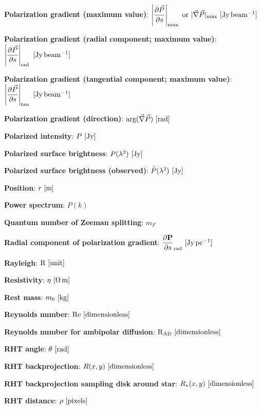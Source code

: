 \documentclass[a4paper,10pt]{article}
\begin{document}
{\noindent}\textbf{Polarization gradient (maximum value)}: $\left\lvert\dfrac{\partial\vec{P}}{\partial s}\right\rvert_{\rm max}~{\rm or}~\lvert\vec\nabla\vec{P}\rvert_{\rm max} ~ [\rm Jy\,beam^{-1}]$

{\noindent}\textbf{Polarization gradient (radial component; maximum value)}: $\left\lvert\dfrac{\partial\vec{P}}{\partial s}\right\rvert_\mathrm{rad}~ [\rm Jy\,beam^{-1}]$

{\noindent}\textbf{Polarization gradient (tangential component; maximum value)}: $\left\lvert\dfrac{\partial\vec{P}}{\partial s}\right\rvert_\mathrm{tan}~ [\rm Jy\,beam^{-1}]$

{\noindent}\textbf{Polarization gradient (direction)}: $\mathrm{arg}(\vec\nabla\vec{P}) ~ [\rm rad]$

{\noindent}\textbf{Polarized intensity}: $P ~ [\rm Jy]$

{\noindent}\textbf{Polarized surface brightness}: $P(\lambda^2) ~ [\rm Jy]$

{\noindent}\textbf{Polarized surface brightness (observed)}: $\tilde{P}(\lambda^2) ~ [\rm Jy]$

{\noindent}\textbf{Position}: $r~[{\rm m}]$

{\noindent}\textbf{Power spectrum}: $P(k)$

{\noindent}\textbf{Quantum number of Zeeman splitting}: $m_F$

{\noindent}\textbf{Radial component of polarization gradient}: $\dfrac{\partial\mathbf{P}}{\partial s}_\mathrm{rad} ~ [{\rm Jy\,pc^{-1}}]$

{\noindent}\textbf{Rayleigh}: ${\rm R} ~ [{\rm unit}]$

{\noindent}\textbf{Resistivity}: $\eta~[{\rm \Omega\,m}]$

{\noindent}\textbf{Rest mass}: $m_0~[{\rm kg}]$

{\noindent}\textbf{Reynolds number}: ${\rm Re}~[{\rm dimensionless}]$

{\noindent}\textbf{Reynolds number for ambipolar diffusion}: ${\rm R}_\mathrm{\rm AD}~[{\rm dimensionless}]$

{\noindent}\textbf{RHT angle}: $\theta~[{\rm rad}]$

{\noindent}\textbf{RHT backprojection}: $R(x,y) ~ [{\rm dimensionless}]$

{\noindent}\textbf{RHT backprojection sampling disk around star}: $R_*(x,y) ~ [{\rm dimensionless}]$

{\noindent}\textbf{RHT distance}: $\rho~[{\rm pixels}]$
\end{document}
